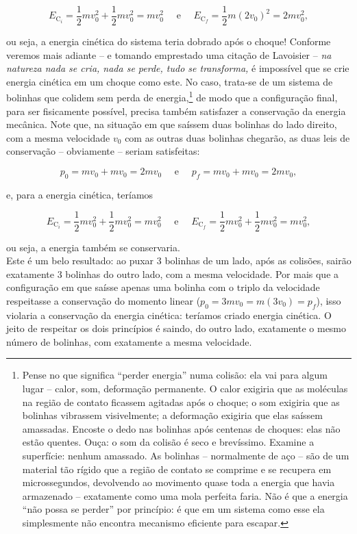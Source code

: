 \begin{exemplo}
$$ E_{\text{C}_i} = \dfrac{1}{2}mv_0^2 + \dfrac{1}{2}mv_0^2 = mv_0^2 \quad \text{ e } \quad  E_{\text{C}_f} = \dfrac{1}{2}m(2v_0)^2 = 2mv_0^2,$$

\noindent ou seja, a energia cinética do sistema teria dobrado após o choque! Conforme veremos mais adiante -- e tomando emprestado uma citação de Lavoisier -- \emph{na natureza nada se cria, nada se perde, tudo se transforma,} é impossível que se crie energia cinética em um choque como este. No caso, trata-se de um sistema de bolinhas que colidem sem perda de energia,\footnote{Pense no que significa ``perder energia'' numa colisão: ela vai para algum lugar -- calor, som, deformação permanente. O calor exigiria que as moléculas na região de contato ficassem agitadas após o choque; o som exigiria que as bolinhas vibrassem visivelmente; a deformação exigiria que elas saíssem amassadas. Encoste o dedo nas bolinhas após centenas de choques: elas não estão quentes. Ouça: o som da colisão é seco e brevíssimo. Examine a superfície: nenhum amassado. As bolinhas -- normalmente de aço -- são de um material tão rígido que a região de contato se comprime e se recupera em microssegundos, devolvendo ao movimento quase toda a energia que havia armazenado -- exatamente como uma mola perfeita faria. Não é que a energia ``não possa se perder'' por princípio: é que em um sistema como esse ela simplesmente não encontra mecanismo eficiente para escapar.} de modo que a configuração final, para ser fisicamente possível, precisa também satisfazer a conservação da energia mecânica. Note que, na situação em que saíssem duas bolinhas do lado direito, com a mesma velocidade $v_0$ com as outras duas bolinhas chegarão, as duas leis de conservação -- obviamente -- seriam satisfeitas:


$$ p_0 = mv_0 + mv_0 = 2mv_0 \quad \text{ e } \quad p_f =  mv_0 + mv_0 = 2mv_0,$$ 

\noindent e, para a energia cinética, teríamos 

$$ E_{\text{C}_i} = \dfrac{1}{2}mv_0^2 + \dfrac{1}{2}mv_0^2 = mv_0^2 \quad \text{ e } \quad  E_{\text{C}_f} =  \dfrac{1}{2}mv_0^2 + \dfrac{1}{2}mv_0^2 = mv_0^2,$$

\noindent ou seja, a energia também se conservaria. \\

Este é um belo resultado: ao puxar $3$ bolinhas de um lado, após as colisões, sairão exatamente 3 bolinhas do outro lado, com a mesma velocidade. Por mais que a configuração em que saísse apenas uma bolinha com o triplo da velocidade respeitasse a conservação do momento linear ($p_0= 3mv_0 = m(3v_0) = p_f$), isso violaria a conservação da energia cinética: teríamos criado energia cinética. O jeito de respeitar os dois princípios é saindo, do outro lado, exatamente o mesmo número de bolinhas, com exatamente a mesma velocidade.\\


\end{exemplo}
